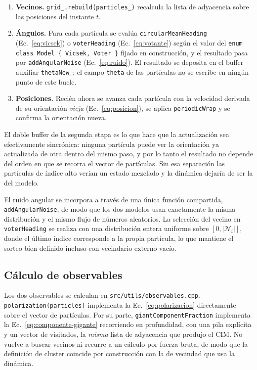 \documentclass[11pt]{article}
\begin{document}
\begin{enumerate}
  \item \textbf{Vecinos.} \texttt{grid\_.rebuild(particles\_)} recalcula la
    lista de adyacencia sobre las posiciones del instante $t$.
  \item \textbf{Ángulos.} Para cada partícula se evalúa
    \texttt{circularMeanHeading} (Ec.~\eqref{eq:vicsek}) o \texttt{voterHeading}
    (Ec.~\eqref{eq:votante}) según el valor del
    \texttt{enum class Model \{ Vicsek, Voter \}} fijado en construcción, y el
    resultado pasa por \texttt{addAngularNoise} (Ec.~\eqref{eq:ruido}). El
    resultado se deposita en el buffer auxiliar \texttt{thetaNew\_}; el campo
    \texttt{theta} de las partículas no se escribe en ningún punto de este
    bucle.
  \item \textbf{Posiciones.} Recién ahora se avanza cada partícula con la
    velocidad derivada de su orientación \emph{vieja}
    (Ec.~\eqref{eq:posicion}), se aplica \texttt{periodicWrap} y se confirma la
    orientación nueva.
\end{enumerate}

El doble buffer de la segunda etapa es lo que hace que la actualización sea
efectivamente sincrónica: ninguna partícula puede ver la orientación ya
actualizada de otra dentro del mismo paso, y por lo tanto el resultado no
depende del orden en que se recorra el vector de partículas. Sin esa separación
las partículas de índice alto verían un estado mezclado y la dinámica dejaría
de ser la del modelo.

El ruido angular se incorpora a través de una única función compartida,
\texttt{addAngularNoise}, de modo que los dos modelos usan exactamente la misma
distribución y el mismo flujo de números aleatorios. La selección del vecino en
\texttt{voterHeading} se realiza con una distribución entera uniforme sobre
$[0, |\mathcal{N}_i|]$, donde el último índice corresponde a la propia
partícula, lo que mantiene el sorteo bien definido incluso con vecindario
externo vacío.

\subsection{Cálculo de observables}
\label{sec:calculo-observables}

Los dos observables se calculan en \texttt{src/utils/observables.cpp}.
\texttt{polarization(particles)} implementa la Ec.~\eqref{eq:polarizacion}
directamente sobre el vector de partículas. Por su parte,
\texttt{giantComponentFraction} implementa la
Ec.~\eqref{eq:componente-gigante} recorriendo en profundidad, con una pila
explícita y un vector de visitados, la \emph{misma} lista de adyacencia que
produjo el CIM. No vuelve a buscar vecinos ni recurre a un cálculo por fuerza
bruta, de modo que la definición de cluster coincide por construcción con la de
vecindad que usa la dinámica.
\end{document}
